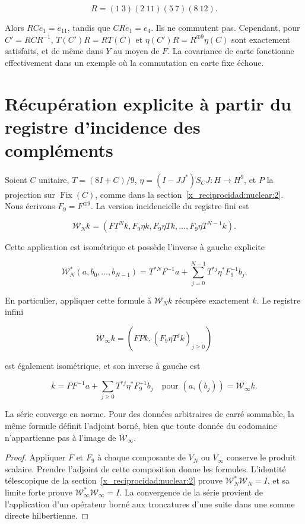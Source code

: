 \[
R=(1\ 3)(2\ 11)(5\ 7)(8\ 12).
\]

Alors \(RCe_1=e_{11}\), tandis que \(CRe_1=e_4\). Ils ne commutent pas. Cependant, pour \(C'=RCR^{-1}\), \(T(C')R=RT(C)\) et \(\eta(C')R=R^{\oplus9}\eta(C)\) sont exactement satisfaits, et de même dans \(Y\) au moyen de \(F\). La covariance de carte fonctionne effectivement dans un exemple où la commutation en carte fixe échoue.


\section{Récupération explicite à partir du registre d’incidence des compléments}\label{x_reciprocidad:nuc05:recuperacion}

Soient \(C\) unitaire, \(T=(8I+C)/9\), \(\eta=(I-JJ^*)S_CJ:H\to H^9\), et \(P\) la projection sur \(\operatorname{Fix}(C)\), comme dans la section~\ref{x_reciprocidad:nuclear:2}. Nous écrivons \(F_9=F^{\oplus9}\). La version incidencielle du registre fini est

\[
\mathcal W_Nk=\left(FT^Nk,F_9\eta k,F_9\eta Tk,\ldots,F_9\eta T^{N-1}k\right).
\]

\begin{theorem}
Cette application est isométrique et possède l’inverse à gauche explicite

\[
\mathcal W_N^*(a,b_0,\ldots,b_{N-1})
=T^{*N}F^{-1}a+
\sum_{j=0}^{N-1}T^{*j}\eta^*F_9^{-1}b_j.
\]

En particulier, appliquer cette formule à \(\mathcal W_Nk\) récupère exactement \(k\). Le registre infini

\[
\mathcal W_\infty k=\left(FPk,(F_9\eta T^jk)_{j\ge0}\right)
\]

est également isométrique, et son inverse à gauche est

\[
k=PF^{-1}a+\sum_{j\ge0}T^{*j}\eta^*F_9^{-1}b_j
\quad\text{pour }(a,(b_j))=\mathcal W_\infty k.
\]

La série converge en norme. Pour des données arbitraires de carré sommable, la même formule définit l’adjoint borné, bien que toute donnée du codomaine n’appartienne pas à l’image de \(\mathcal W_\infty\).
\end{theorem}

\begin{proof}
Appliquer \(F\) et \(F_9\) à chaque composante de \(V_N\) ou \(V_\infty\) conserve le produit scalaire. Prendre l’adjoint de cette composition donne les formules. L’identité télescopique de la section~\ref{x_reciprocidad:nuclear:2} prouve \(\mathcal W_N^*\mathcal W_N=I\), et sa limite forte prouve \(\mathcal W_\infty^*\mathcal W_\infty=I\). La convergence de la série provient de l’application d’un opérateur borné aux troncatures d’une suite dans une somme directe hilbertienne.
\end{proof}

